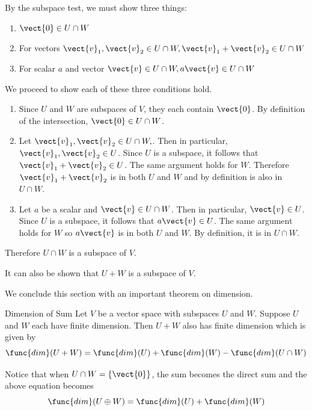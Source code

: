 \begin{solution}
By the subspace test, we must show three things:
\begin{enumerate}
\item $\vect{0} \in U \cap W$
\item For vectors $\vect{v}_1, \vect{v}_2 \in U \cap W, \vect{v}_1+\vect{v}_2 \in U \cap W$
\item For scalar $a$ and vector $\vect{v} \in U \cap W, a\vect{v} \in U \cap W$
\end{enumerate}

We proceed to show each of these three conditions hold.
\begin{enumerate}
\item 
Since $U$ and $W$ are subspaces of $V$, they each contain $\vect{0}$. By definition of the intersection, $\vect{0} \in U \cap W$. 

\item
Let  $\vect{v}_1, \vect{v}_2 \in U \cap W,$. Then in particular,  $\vect{v}_1, \vect{v}_2 \in U$. Since $U$ is a subspace, it follows that $ \vect{v}_1+\vect{v}_2 \in U$. The same argument holds for $W$. Therefore $\vect{v}_1+\vect{v}_2$ is in both $U$ and $W$ and by definition is also in $U \cap W$. 

\item 
Let $a$ be a scalar and $\vect{v} \in U \cap W$. Then in particular, $\vect{v} \in U$. Since $U$ is a subspace, it follows that $a \vect{v} \in U$. The same argument holds for $W$ so $a\vect{v}$ is in both $U$ and $W$. By definition, it is in $U \cap W$. 
\end{enumerate}

Therefore $U \cap W$ is a subspace of $V$. 
\end{solution}

It can also be shown that $U + W$ is a subspace of $V$.

We conclude this section with an important theorem on dimension.

\begin{theorem}{Dimension of Sum}\label{thm:dimensionsum}
Let $V$ be a vector space with subspaces $U$ and $W$. Suppose $U$ and $W$ each have finite dimension. Then $U + W$ also has finite dimension which is given by\[
\func{dim} (U+W) = \func{dim}(U) + \func{dim}(W) - \func{dim} (U \cap W)
\]
\end{theorem}

Notice that when $U \cap W = \left\{ \vect{0} \right\}$, the sum becomes the direct sum and the above equation becomes 
\[
\func{dim} (U \oplus W) = \func{dim}(U) + \func{dim}(W)
\]